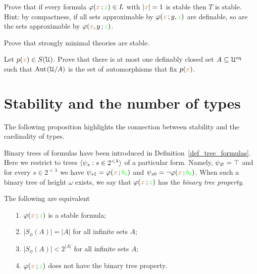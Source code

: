 \documentclass[creche.tex]{subfiles}
\begin{document}
\begin{exercise}
Prove that if every formula $\varphi({\color{brown} x}\,;{\color{green} z})\in L$ with $|{\color{brown} x}|=1$ is stable then $T$ is stable. Hint: by compactness, if all sets approximable by $\varphi({\color{brown} x}\,;y,{\color{green} z})$ are definable, so are the sets approximable by $\varphi({\color{brown} x},y\,;{\color{green} z})$.\QED
\end{exercise}


\begin{exercise}
Prove that strongly minimal theories are stable.\QED
\end{exercise}


\begin{exercise}\label{ex_Cb}
Let $p({\color{brown} x})\in S(\EuScript U)$. Prove that there is at most one definably closed set $A\subseteq\EuScript U^{{\rm eq}}$ such that $\textrm{Aut\kern.15ex}(\EuScript U/A)$ is the set of automorphisms that fix $p({\color{brown} x})$.\QED
\end{exercise}

\section{Stability and the number of types}

The following proposition highlights the connection between stability and the cardinality of types. 

Binary trees of formulas have been introduced in Definition~\ref{def_tree_formulas}. Here we restrict to trees $\langle\psi_s:s\in 2^{<\lambda}\rangle$ of a particular form. Namely, $\psi_\varnothing=\top$ and for every $s\in 2^{<\lambda}$ we have $\psi_{s1}=\varphi({\color{brown} x}\,;{\color{green} b_s})$ and $\psi_{s0}=\neg\varphi({\color{brown} x}\,;{\color{green} b_s})$. When such a binary tree of height $\omega$ exists, we say that $\varphi({\color{brown} x}\,;{\color{green} z})$ has the \emph{binary tree property}.

\begin{proposition}\label{prop_count_types}
The following are equivalent
\begin{itemize}
\item[1.] $\varphi({\color{brown} x}\,;{\color{green} z})$ is a stable formula;
\item[2.] $\big|S_{\phi}(A)\big|=|A|$ for all infinite sets $A$;
\item[3.] $\big|S_{\phi}(A)\big|<2^{|A|}$ for all infinite sets $A$;
\item[4.] $\varphi({\color{brown} x}\,;{\color{green} z})$ does not have the binary tree property.
\end{itemize}
\end{proposition}

\def\ceq#1#2#3{\parbox[t]{15ex}{$\displaystyle #1$}\medrel{#2}$\displaystyle  #3$}
\end{document}
